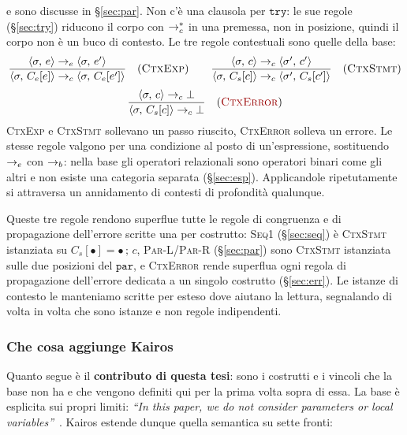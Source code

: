 e sono discusse in \S\ref{sec:par}. Non c'è una clausola per
$\mathtt{try}$: le sue regole (\S\ref{sec:try}) riducono il corpo con
$\toc^{*}$ in una premessa, non in posizione, quindi il corpo non è un buco
di contesto. Le tre regole contestuali sono quelle della base:
\[
\dfrac{\cfg{e}{\sigma} \toe \cfg{e'}{\sigma}}
      {\cfg{C_e[e]}{\sigma} \toc \cfg{C_e[e']}{\sigma}} \rname{CtxExp}
\qquad
\dfrac{\cfg{c}{\sigma} \toc \cfg{c'}{\sigma'}}
      {\cfg{C_s[c]}{\sigma} \toc \cfg{C_s[c']}{\sigma'}} \rname{CtxStmt}
\]
\[
\dfrac{\cfg{c}{\sigma} \toc \bot}
      {\cfg{C_s[c]}{\sigma} \toc \bot} \rnameerr{CtxError}
\]
\textsc{CtxExp} e \textsc{CtxStmt} sollevano un passo riuscito,
\textsc{CtxError} solleva un errore. Le stesse regole valgono per una
condizione al posto di un'espressione, sostituendo $\toe$ con $\tob$: nella
base gli operatori relazionali sono operatori binari come gli altri e non
esiste una categoria separata (\S\ref{sec:esp}). Applicandole ripetutamente si
attraversa un annidamento di contesti di profondità qualunque.

\medskip
\noindent
Queste tre regole rendono superflue tutte le regole di congruenza e di
propagazione dell'errore scritte una per costrutto: \textsc{Seq1}
(\S\ref{sec:seq}) è \textsc{CtxStmt} istanziata su $C_s[\bullet] =
\bullet\,;\,c$, \textsc{Par-L}/\textsc{Par-R} (\S\ref{sec:par}) sono
\textsc{CtxStmt} istanziata sulle due posizioni del $\mathtt{par}$, e
\textsc{CtxError} rende superflua ogni regola di
propagazione dell'errore dedicata a un singolo costrutto (\S\ref{sec:err}).
Le istanze di contesto le manteniamo scritte per esteso dove aiutano la
lettura, segnalando di volta in volta che sono istanze e non regole
indipendenti.

\subsubsection*{Che cosa aggiunge Kairos}

Quanto segue è il \textbf{contributo di questa tesi}: sono i costrutti e i
vincoli che la base non ha e che vengono definiti qui per la prima volta sopra
di essa. La base è esplicita sui propri limiti:
\emph{``In this paper, we do not consider parameters or local
variables''}~\cite{LamiLaneseStefani2024}. Kairos estende dunque quella
semantica su sette fronti:


